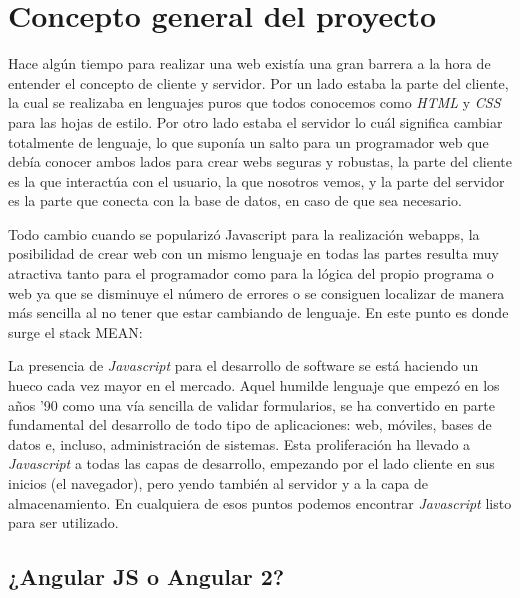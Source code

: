 \section{Concepto general del proyecto}\label{teorico-general}
Hace algún tiempo para realizar una web existía una gran barrera a la hora de entender el concepto de cliente y servidor. Por un lado estaba la parte del cliente, la cual se realizaba en lenguajes puros que todos conocemos como \emph{HTML} y \emph{CSS} para las hojas de estilo. Por otro lado estaba el servidor lo cuál significa cambiar totalmente de lenguaje, lo que suponía un salto para un programador web que debía conocer ambos lados para crear webs seguras y robustas, la parte del cliente es la que interactúa con el usuario, la que nosotros vemos, y la parte del servidor es la parte que conecta con la base de datos, en caso de que sea necesario.

Todo cambio cuando se popularizó Javascript para la realización webapps, la posibilidad de crear web con un mismo lenguaje en todas las partes resulta muy atractiva tanto para el programador como para la lógica del propio programa o web ya que se disminuye el número de errores o se consiguen localizar de manera más sencilla al no tener que estar cambiando de lenguaje. En este punto es donde surge el stack MEAN:




La presencia de \emph{Javascript} para el desarrollo de software se está haciendo un hueco cada vez mayor en el mercado. Aquel humilde lenguaje que empezó en los años '90 como una vía sencilla de validar formularios, se ha convertido en parte fundamental del desarrollo de todo tipo de aplicaciones: web, móviles, bases de datos e, incluso, administración de sistemas. Esta proliferación ha llevado a  \emph{Javascript} a todas las capas de desarrollo, empezando por el lado cliente en sus inicios (el navegador), pero yendo también al servidor y a la capa de almacenamiento. En cualquiera de esos puntos podemos encontrar  \emph{Javascript} listo para ser utilizado.




\subsection{¿Angular JS o Angular 2?}\label{angular-js-o-angular-2}





